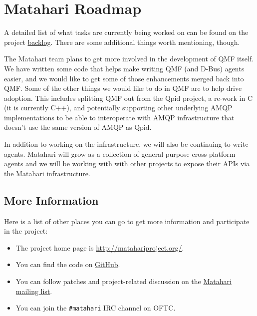 \section{Matahari Roadmap}

A detailed list of what tasks are currently being worked on can be found on the project \href{https://github.com/matahari/matahari/wiki/Backlog}{backlog}.  There are some additional things worth mentioning, though.

The Matahari team plans to get more involved in the development of QMF itself.  We have written some code that helps make writing QMF (and D-Bus) agents easier, and we would like to get some of those enhancements merged back into QMF.  Some of the other things we would like to do in QMF are to help drive adoption.  This includes splitting QMF out from the Qpid project, a re-work in C (it is currently C++), and potentially supporting other underlying AMQP implementations to be able to interoperate with AMQP infrastructure that doesn't use the same version of AMQP as Qpid.

In addition to working on the infrastructure, we will also be continuing to write agents.  Matahari will grow as a collection of general-purpose cross-platform agents and we will be working with with other projects to expose their APIs via the Matahari infrastructure.

\begin{marginfigure}
\subsection{More Information}

Here is a list of other places you can go to get more information and participate in the project:

\begin{itemize}
\item The project home page is \url{http://matahariproject.org/}.
\item You can find the code on \href{https://github.com/matahari/matahari}{GitHub}.
\item You can follow patches and project-related discussion on the \href{https://fedorahosted.org/mailman/listinfo/matahari}{Matahari mailing list}. 
\item You can join the \texttt{\#matahari} IRC channel on OFTC.
\end{itemize}
\end{marginfigure}
